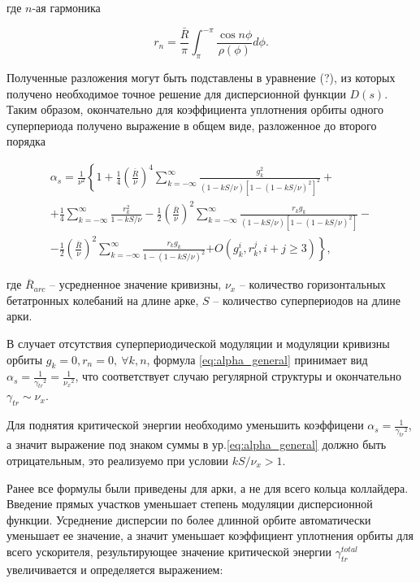 \noindent где $n$-ая гармоника

\begin{equation}
r_n=\frac{\bar{R}}{\pi} \int_\pi^{-\pi} \frac{\cos n \phi}{\rho(\phi)} d \phi.
\end{equation}

\noindent Полученные разложения могут быть подставлены в уравнение (?), из которых получено необходимое точное решение для дисперсионной функции $D(s)$. Таким образом, окончательно для коэффициента уплотнения орбиты одного суперпериода получено выражение в общем виде, разложенное до второго порядка

\begin{equation}
\begin{gathered}
\alpha_s=\frac{1}{\nu^2}\left\{1+\frac{1}{4}\left(\frac{\bar{R}}{\nu}\right)^4 \sum_{k=-\infty}^{\infty}\right.
\frac{g_k^2}{(1-k S / \nu)\left[1-(1-k S / \nu)^2\right]^2}+ \\
+\frac{1}{4} \sum_{k=-\infty}^{\infty} \frac{r_k^2}{1-k S / \nu} -\frac{1}{2}\left(\frac{\bar{R}}{\nu}\right)^2 \sum_{k=-\infty}^{\infty} \frac{r_k g_k}{(1-k S / \nu)\left[1-(1-k S / \nu)^2\right]} - \\
-\frac{1}{2}\left(\frac{\bar{R}}{\nu}\right)^2 \sum_{k=-\infty}^{\infty} \frac{r_k g_k}{1-(1-k S / \nu)^2}
\left.+O\left(g_k^i, r_k^j, i+j \geq 3\right)\right\},
\end{gathered}
\label{eq:alpha_general}
\end{equation}

\noindent где ${\overline{R}}_{arc}$ -- усредненное значение кривизны, $\nu_{x}$ -- количество горизонтальных бетатронных колебаний на длине арке, $S$ -- количество суперпериодов на длине арки.

\noindent В случает отсутствия суперпериодической модуляции и модуляции кривизны орбиты $g_k=0, r_n=0, \  \forall k,n$, формула \ref{eq:alpha_general} принимает вид $\alpha_s=\frac{1}{{\gamma_{tr}}^2}=\frac{1}{{\nu_x}^2}$, что соответствует случаю регулярной структуры и окончательно  $\gamma_{tr}\sim\nu_x$.

\par Для поднятия критической энергии необходимо уменьшить коэффицени $\alpha_s=\frac{1}{{\gamma_{tr}}^2}$, а значит выражение под знаком суммы в ур.\ref{eq:alpha_general} должно быть отрицательным, это реализуемо при условии $kS/\nu_{x}>1$.

Ранее все формулы были приведены для арки, а не для всего кольца коллайдера. Введение прямых участков уменьшает степень модуляции дисперсионной функции. Усреднение дисперсии по более длинной орбите автоматически уменьшает ее значение, а значит уменьшает коэффициент уплотнения орбиты для всего ускорителя, результирующее значение критической энергии $\gamma_{tr}^{total}$ увеличивается и определяется выражением:

